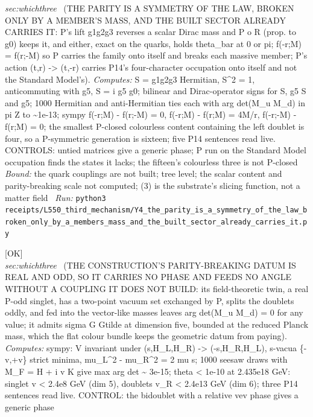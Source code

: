 \begin{description}
\textit{sec:whichthree} \ (THE PARITY IS A SYMMETRY OF THE LAW, BROKEN ONLY BY A MEMBER'S MASS, AND THE BUILT SECTOR ALREADY CARRIES IT: P's lift g1g2g3 reverses a scalar Dirac mass and P o R (prop. to g0) keeps it, and either, exact on the quarks, holds theta\_bar at 0 or pi; f(-r;M) = f(r;-M) so P carries the family onto itself and breaks each massive member; P's action (t,r) -> (t,-r) carries P14's four-character occupation onto itself and not the Standard Model's). 
\emph{Computes:} S = g1g2g3 Hermitian, S\textasciicircum{}2 = 1, anticommuting with g5, S = i g5 g0; bilinear and Dirac-operator signs for S, g5 S and g5; 1000 Hermitian and anti-Hermitian ties each with arg det(M\_u M\_d) in pi Z to \textasciitilde{}1e-13; sympy f(-r;M) - f(r;-M) = 0, f(-r;M) - f(r;M) = 4M/r, f(-r;-M) - f(r;M) = 0; the smallest P-closed colourless content containing the left doublet is four, so a P-symmetric generation is sixteen; five P14 sentences read live. CONTROLS: untied matrices give a generic phase; P run on the Standard Model occupation finds the states it lacks; the fifteen's colourless three is not P-closed
 \emph{Bound:} the quark couplings are not built; tree level; the scalar content and parity-breaking scale not computed; (3) is the substrate's slicing function, not a matter field
\ \emph{Run:} \texttt{python3 receipts/L550\_third\_mechanism/Y4\_the\_parity\_is\_a\_symmetry\_of\_the\_law\_broken\_only\_by\_a\_members\_mass\_and\_the\_built\_sector\_already\_carries\_it.py}
\item[\label{rcpt:Y6_the_constructions_parity_breaking_datum_is_real_and_odd_so_it_carries_no_phase_and_feeds_no_angle_without_a_coupling_it_does_not_build}\textbf{}\quad\texttt{Y6\_the\_constructions\_parity\_breaking\_datum\_is\_real\_and\_odd\_so\_it\_carries\_no\_phase\_and\_feeds\_no\_angle\_without\_a\_coupling\_it\_does\_not\_build}]\hfill\textsf{[OK]}\\
\textit{sec:whichthree} \ (THE CONSTRUCTION'S PARITY-BREAKING DATUM IS REAL AND ODD, SO IT CARRIES NO PHASE AND FEEDS NO ANGLE WITHOUT A COUPLING IT DOES NOT BUILD: its field-theoretic twin, a real P-odd singlet, has a two-point vacuum set exchanged by P, splits the doublets oddly, and fed into the vector-like masses leaves arg det(M\_u M\_d) = 0 for any value; it admits sigma G Gtilde at dimension five, bounded at the reduced Planck mass, which the flat colour bundle keeps the geometric datum from paying). 
\emph{Computes:} sympy: V invariant under (s,H\_L,H\_R) -> (-s,H\_R,H\_L), s-vacua \{-v,+v\} strict minima, mu\_L\textasciicircum{}2 - mu\_R\textasciicircum{}2 = 2 mu s; 1000 seesaw draws with M\_F = H + i v K give max \textbar{}arg det\textbar{} \textasciitilde{} 3e-15; theta < 1e-10 at 2.435e18 GeV: singlet v < 2.4e8 GeV (dim 5), doublets v\_R < 2.4e13 GeV (dim 6); three P14 sentences read live. CONTROL: the bidoublet with a relative vev phase gives a generic phase

\end{description}
